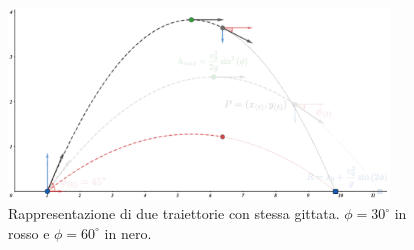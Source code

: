 \begin{figure}[h]
        \includegraphics[width=0.9\textwidth]{images/MP2.png} 
        \caption{Rappresentazione di due traiettorie con stessa gittata.
        $\phi = 30^\circ$ in rosso e $\phi = 60^\circ$ in nero.}
\label{fig:MP_2}
\end{figure}